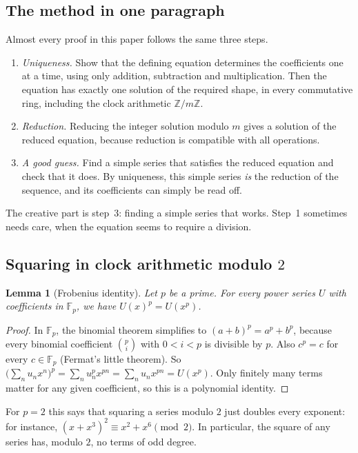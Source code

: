 \documentclass[11pt,a4paper]{article}
\newtheorem{lemma}[theorem]{Lemma}
\theoremstyle{definition}
\theoremstyle{remark}
\newcommand{\Z}{\mathbb{Z}}
\newcommand{\F}{\mathbb{F}}
\begin{document}
\subsection{The method in one paragraph}
Almost every proof in this paper follows the same three steps.
\begin{enumerate}
\item \emph{Uniqueness.} Show that the defining equation determines the coefficients one at a time, using only
addition, subtraction and multiplication. Then the equation has exactly one solution of the required shape, in every
commutative ring, including the clock arithmetic $\Z/m\Z$.
\item \emph{Reduction.} Reducing the integer solution modulo $m$ gives a solution of the reduced equation,
because reduction is compatible with all operations.
\item \emph{A good guess.} Find a simple series that satisfies the reduced equation and check that it does. By uniqueness,
this simple series \emph{is} the reduction of the sequence, and its coefficients can simply be read off.
\end{enumerate}
The creative part is step~3: finding a simple series that works. Step~1 sometimes needs care, when the equation seems to
require a division.
\subsection{Squaring in clock arithmetic modulo \texorpdfstring{$2$}{2}}
\begin{lemma}[Frobenius identity]\label{lem:frobenius}
Let $p$ be a prime. For every power series $U$ with coefficients in $\F_p$, we have $U(x)^p=U(x^p)$.
\end{lemma}

\begin{proof}
In $\F_p$, the binomial theorem simplifies to $(a+b)^p=a^p+b^p$, because every binomial coefficient
$\binom pi$ with $0<i<p$ is divisible by $p$. Also $c^p=c$ for every $c\in\F_p$ (Fermat's little theorem). So
$\bigl(\sum_nu_nx^n\bigr)^p=\sum_nu_n^px^{pn}=\sum_nu_nx^{pn}=U(x^p)$. Only finitely many terms matter for any given
coefficient, so this is a polynomial identity.
\end{proof}

For $p=2$ this says that squaring a series modulo $2$ just doubles every exponent: for instance,
$(x+x^3)^2\equiv x^2+x^6\pmod2$. In particular, the square of any series has, modulo $2$, no terms of odd degree.
\end{document}

